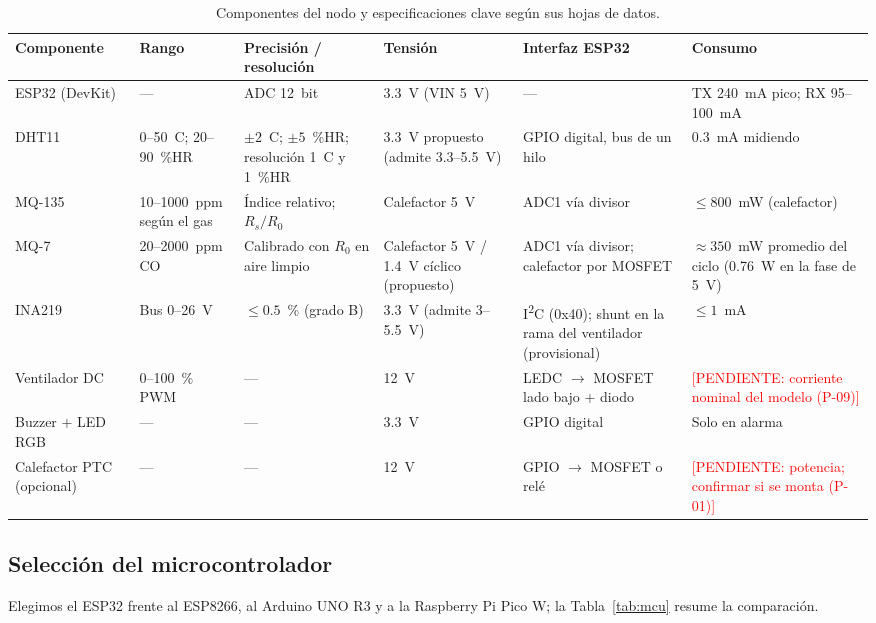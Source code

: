 \documentclass[manuscript,screen,nonacm,natbib=false]{acmart}
\newcommand{\pendiente}[1]{\textcolor{red}{[PENDIENTE: #1]}}
\newcommand{\gradC}{\textdegree{}C}
\newcommand{\IIC}{I\textsuperscript{2}C}
\begin{document}
\begin{table}[htbp]
\caption{Componentes del nodo y especificaciones clave según sus hojas de datos.}
\label{tab:componentes}
\footnotesize
\begin{tabularx}{\linewidth}{@{}P{2.2cm} Y Y P{1.7cm} P{2.1cm} Y@{}}
\toprule
Componente & Rango & Precisión / resolución & Tensión & Interfaz ESP32 & Consumo \\
\midrule
ESP32 (DevKit)~\cite{espressif2026esp32} & --- & ADC 12~bit & 3.3~V (VIN 5~V) & --- & TX 240~mA pico; RX 95--100~mA \\
DHT11~\cite{aosong2013dht11} & 0--50~\gradC{}; 20--90~\%HR & $\pm 2$~\gradC{}; $\pm 5$~\%HR; resolución 1~\gradC{} y 1~\%HR & 3.3~V propuesto (admite 3.3--5.5~V) & GPIO digital, bus de un hilo & 0.3~mA midiendo \\
MQ-135~\cite{hanwei2008mq135} & 10--1000~ppm según el gas & Índice relativo; $R_s/R_0$ & Calefactor 5~V & ADC1 vía divisor & $\leq 800$~mW (calefactor) \\
MQ-7~\cite{hanwei2007mq7} & 20--2000~ppm CO & Calibrado con $R_0$ en aire limpio & Calefactor 5~V / 1.4~V cíclico (propuesto) & ADC1 vía divisor; calefactor por MOSFET & $\approx 350$~mW promedio del ciclo (0.76~W en la fase de 5~V) \\
INA219~\cite{ti2015ina219} & Bus 0--26~V & $\leq 0.5$~\% (grado B) & 3.3~V (admite 3--5.5~V) & \IIC{} (0x40); shunt en la rama del ventilador (provisional) & $\leq 1$~mA \\
Ventilador DC & 0--100~\% PWM & --- & 12~V & LEDC $\to$ MOSFET lado bajo + diodo & \pendiente{corriente nominal del modelo (P-09)} \\
Buzzer + LED RGB & --- & --- & 3.3~V & GPIO digital & Solo en alarma \\
Calefactor PTC (opcional) & --- & --- & 12~V & GPIO $\to$ MOSFET o relé & \pendiente{potencia; confirmar si se monta (P-01)} \\
\bottomrule
\end{tabularx}
\end{table}

\subsection{Selección del microcontrolador}
Elegimos el ESP32 frente al ESP8266, al Arduino UNO R3 y a la Raspberry Pi Pico W; la Tabla~\ref{tab:mcu} resume la comparación.
\end{document}
